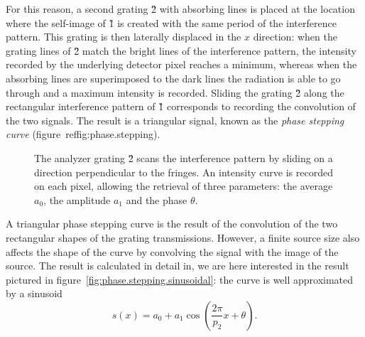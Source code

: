 For this reason, a second grating \G2 with absorbing lines is placed at the
location where the self-image of \G1 is created with the same period of the
interference pattern. This grating is then laterally displaced in the $x$
direction: when the grating lines of \G2
match the bright lines of the interference pattern, the intensity recorded
by the underlying detector pixel reaches a minimum, whereas when the
absorbing lines are superimposed to the dark lines the radiation is able to
go through and a maximum intensity is recorded. Sliding the grating \G2
along the rectangular interference pattern of \G1 corresponds to recording
the convolution of the two signals. The result is a triangular signal, known
as the \emph{phase stepping curve} (figure~ref{fig:phase.stepping}).
\begin{figure}[htb]
    \centering
    
    \caption[Phase stepping curve.]{The analyzer grating \G{2} scans the
    interference pattern by sliding on a direction perpendicular to the
    fringes. An intensity curve is recorded on each pixel, allowing the
    retrieval of three parameters: the average $a_0$, the amplitude $a_1$
and the phase $\theta$.}
    \label{fig:phase.stepping}
\end{figure}

A triangular phase stepping curve is the result of the convolution of the
two rectangular shapes of the grating transmissions. However, a finite
source size also affects the shape of the curve by convolving the signal
with the image of the source. The result is calculated in detail in\cn, we
are here interested in the result pictured in
figure~\ref{fig:phase.stepping.sinusoidal}: the curve is well approximated by a
sinusoid
\begin{equation*}
    s(x) = a_0 + a_1 \cos \left(\frac{2 \pi}{p_2} x + \theta\right).
\end{equation*}

